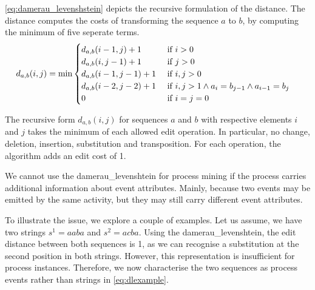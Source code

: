 \documentclass[./../../paper.tex]{subfiles}
\begin{document}
\noindent \autoref{eq:damerau_levenshstein} depicts the recursive formulation of the distance. The distance computes the costs of transforming the sequence $a$ to $b$, by computing the minimum of five seperate terms. %
\begin{align}
    \label{eq:damerau_levenshstein}
    d_{a, b}(i, j) & =\min
    \begin{cases}
        d_{a, b}(i-1, j  )+ 1 & \text { if } i>0                                            \\
        d_{a, b}(i  , j-1)+ 1 & \text { if } j>0                                            \\
        d_{a, b}(i-1, j-1)+ 1 & \text { if } i, j>0                                         \\
        d_{a, b}(i-2, j-2)+ 1 & \text { if } i, j>1 \land a_{i}=b_{j-1} \land a_{i-1}=b_{j} \\
        0                                 & \text { if } i=j=0                                         
    \end{cases}        
\end{align}

\noindent The recursive form $d_{a, b}(i, j)$ for sequences $a$ and $b$ with respective elements $i$ and $j$ takes the minimum of each allowed edit operation. In particular, no change, deletion, insertion, substitution and transposition. For each operation, the algorithm adds an edit cost of 1. 

We cannot use the \gls{damerau_levenshtein} for process mining if the process carries additional information about event attributes. Mainly, because two events may be emitted by the same activity, but they may still carry different event attributes. 

To illustrate the issue, we explore a couple of examples. Let us assume, we have two strings $s^1=aaba$ and $s^2=acba$. Using the \gls{damerau_levenshtein}, the edit distance between both sequences is 1, as we can recognise a substitution at the second position in both strings. However, this representation is insufficient for process instances. Therefore, we now characterise the two sequences as process events rather than strings in \autoref{eq:dlexample}. 
\end{document}
